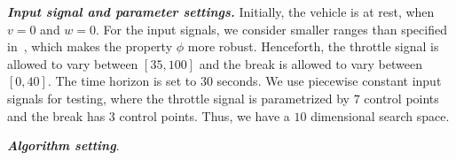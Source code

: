 
\emph{\textbf{Input signal and parameter settings.}}
Initially, the vehicle is at rest, when $v=0$ and $w=0$.  For the
input signals, we consider smaller ranges than specified
in~\cite{FainekosARCH1415}, which makes the property $\phi$ more
robust.  Henceforth, the throttle signal is allowed to vary between
$[35,100]$ and the break is allowed to vary between $[0,40]$.  The
time horizon is set to $30$ seconds.  We use piecewise constant input
signals for testing, where the throttle signal is parametrized by $7$
control points and the break has $3$ control points. Thus, we have a
$10$ dimensional search space.

\emph{\textbf{Algorithm setting}}.  


